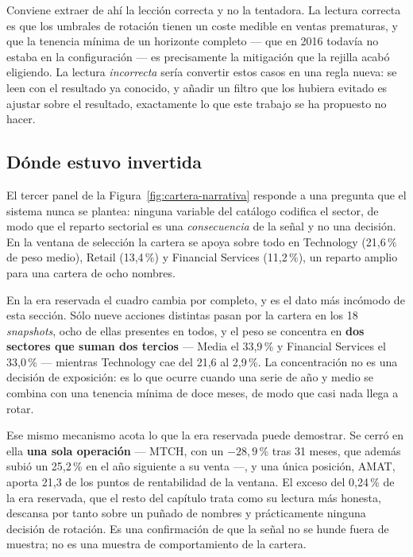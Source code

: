 Conviene extraer de ahí la lección correcta y no la tentadora. La lectura correcta es que los
umbrales de rotación tienen un coste medible en ventas prematuras, y que la tenencia mínima de un
horizonte completo --- que en 2016 todavía no estaba en la configuración --- es precisamente la
mitigación que la rejilla acabó eligiendo. La lectura \emph{incorrecta} sería convertir estos casos
en una regla nueva: se leen con el resultado ya conocido, y añadir un filtro que los hubiera
evitado es ajustar sobre el resultado, exactamente lo que este trabajo se ha propuesto no hacer.

\subsection*{Dónde estuvo invertida}

El tercer panel de la Figura~\ref{fig:cartera-narrativa} responde a una pregunta que el sistema nunca se plantea: ninguna
variable del catálogo codifica el sector, de modo que el reparto sectorial es una \emph{consecuencia}
de la señal y no una decisión. En la ventana de selección la cartera se apoya sobre todo en
Technology (21,6\,\% de peso medio), Retail (13,4\,\%) y Financial Services (11,2\,\%), un reparto
amplio para una cartera de ocho nombres.

En la era reservada el cuadro cambia por completo, y es el dato más incómodo de esta sección. Sólo
nueve acciones distintas pasan por la cartera en los 18 \textit{snapshots}, ocho de ellas presentes
en todos, y el peso se concentra en \textbf{dos sectores que suman dos tercios} --- Media el
33,9\,\% y Financial Services el 33,0\,\% --- mientras Technology cae del 21,6 al 2,9\,\%. La
concentración no es una decisión de exposición: es lo que ocurre cuando una serie de año y medio se
combina con una tenencia mínima de doce meses, de modo que casi nada llega a rotar.

Ese mismo mecanismo acota lo que la era reservada puede demostrar. Se cerró en ella \textbf{una sola
operación} --- MTCH, con un $-28{,}9$\,\% tras 31 meses, que además subió un 25,2\,\% en el año
siguiente a su venta ---, y una única posición, AMAT, aporta 21,3 de los puntos de rentabilidad de
la ventana. El exceso del 0,24\,\% de la era reservada, que el resto del capítulo trata como su
lectura más honesta, descansa por tanto sobre un puñado de nombres y prácticamente ninguna decisión
de rotación. Es una confirmación de que la señal no se hunde fuera de muestra; no es una muestra de
comportamiento de la cartera.

